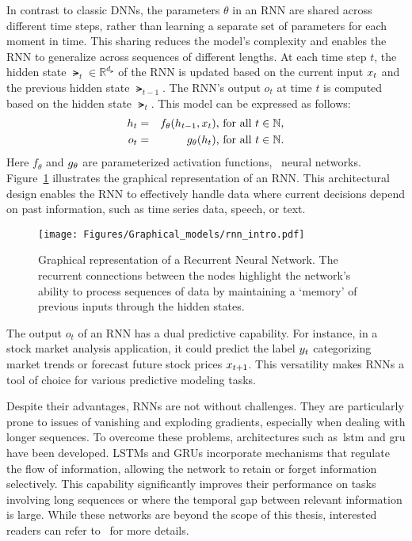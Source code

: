 In contrast to classic DNNs,
the parameters $\theta$ in an RNN are shared across different time steps,
rather than learning a separate set of parameters for each moment in time.
This sharing reduces the model's complexity and enables the RNN to generalize across
sequences of different
 lengths. At each time step $t$, the hidden
state $\lat_t \in \mathbb{R}^{d_\lat}$ of the RNN is updated based on the current
input $x_t$ and the
previous hidden state $\lat_{t-1}$. The RNN's output $o_t$  at time $t$ is
computed based on the hidden state $\lat_t$.
This model can be expressed as follows:
\begin{eqnarray} 
    \label{eq:rnn_v1} h_t&=&f_{\theta}(h_{t-1},x_{t}) 
    \text{, } \text{for all } t\in\mathbb{N} \text{,}\\
    \label{eq:rnn_v2} o_t&=&g_{\theta}(h_{t})
    \text{, } \text{for all } t\in\mathbb{N} \text{.} 
\end{eqnarray} 
Here $f_{\theta}$ and $g_{\theta}$ are parameterized activation functions, \eg~neural networks.
Figure~\ref{fig:rnn_intro} illustrates the graphical representation of an RNN.
This architectural design enables the RNN to effectively handle data where 
current decisions depend on past information, such as time series data, speech, or text.
\begin{figure}[htb]
    \centering
    \texttt{[image: Figures/Graphical\_models/rnn\_intro.pdf]}
    \caption{Graphical representation of a Recurrent Neural Network.
    The recurrent connections between the nodes highlight the network's
    ability to process sequences of data by maintaining a `memory' of previous
    inputs through the hidden states.}
    \label{fig:rnn_intro}
\end{figure}

\begin{remark}
    The output $o_t$ of an RNN has a dual predictive capability. For instance,
    in a stock market analysis application, it could predict the label $y_t$
    categorizing market trends or forecast future stock prices $x_{t+1}$. 
    This versatility makes RNNs a tool of
    choice for various predictive modeling tasks.
\end{remark}

Despite their advantages, RNNs are not without challenges.
They are particularly prone to issues of vanishing and exploding gradients, 
especially when dealing with longer sequences. 
To overcome these problems, architectures
such as~\gls*{lstm} and \gls*{gru} have been
developed. LSTMs and GRUs incorporate mechanisms that regulate the flow of
information, allowing the network to retain or forget information selectively.
This capability significantly improves their performance on tasks involving long
sequences or where the temporal gap between relevant information is large.
While these networks are beyond the scope of this thesis, interested readers can
refer to~\cite{sherstinsky2020fundamentals, LSTM, GRU} for more details.



